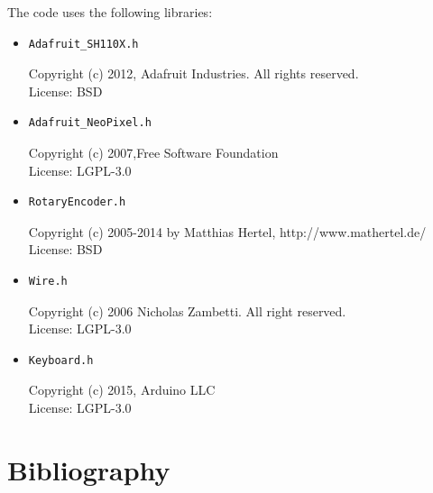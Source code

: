 \documentclass{article}
\begin{document}
The code uses the following libraries: \\
\begin{itemize}

    \item \begin{verbatim}Adafruit_SH110X.h\end{verbatim} 
    Copyright (c) 2012, Adafruit Industries. All rights reserved. \\
    License: BSD

    \item \begin{verbatim}Adafruit_NeoPixel.h\end{verbatim} 
    Copyright (c) 2007,Free Software Foundation \\
    License: LGPL-3.0

    \item \begin{verbatim}RotaryEncoder.h\end{verbatim} 
    Copyright (c) 2005-2014 by Matthias Hertel,  http://www.mathertel.de/  \\
    License: BSD

    \item \begin{verbatim}Wire.h\end{verbatim} 
    Copyright (c) 2006 Nicholas Zambetti.  All right reserved. \\
    License: LGPL-3.0

    \item \begin{verbatim}Keyboard.h\end{verbatim} 
    Copyright (c) 2015, Arduino LLC \\
    License: LGPL-3.0

\end{itemize}


\section{Bibliography}
\end{document}
